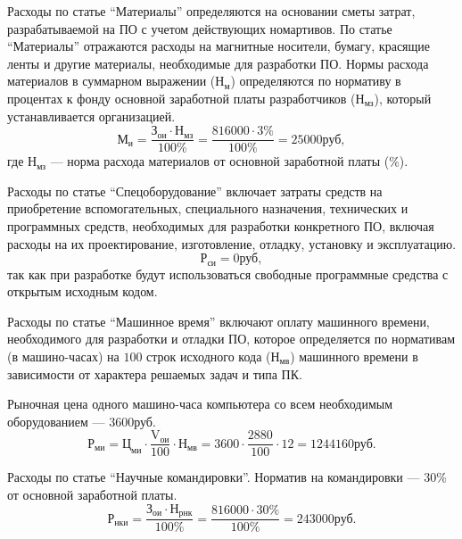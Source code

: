 Расходы по статье ``Материалы'' определяются на основании сметы затрат, разрабатываемой на ПО с учетом действующих номартивов. По статье ``Материалы'' отражаются расходы на магнитные носители, бумагу, красящие ленты и другие материалы, необходимые для разработки ПО. Нормы расхода материалов в суммарном выражении (\( \text{Н}_{\text{м}} \)) определяются по нормативу в процентах к фонду основной заработной платы разработчиков (\( \text{Н}_{\text{мз}} \)), который устанавливается организацией.
\begin{displaymath}
  \text{М}_{\text{и}} = \frac{\text{З}_{\text{ои}} \cdot \text{Н}_{\text{мз}}}{100\%} = \frac{816000 \cdot 3\%}{100\%} = 25000 \text{руб},
\end{displaymath}
где \( \text{Н}_{\text{мз}} \) --- норма расхода материалов от основной заработной платы (\( \% \)).

Расходы по статье ``Спецоборудование'' включает затраты средств на приобретение вспомогательных, специального назначения, технических и программных средств, необходимых для разработки конкретного ПО, включая расходы на их проектирование, изготовление, отладку, установку и эксплуатацию.
\begin{displaymath}
  \text{Р}_{\text{си}} = 0 \text{руб},
\end{displaymath}
так как при разработке будут использоваться свободные программные средства с открытым исходным кодом.

Расходы по статье ``Машинное время'' включают оплату машинного времени, необходимого для разработки и отладки ПО, которое определяется по нормативам (в машино-часах) на \( 100 \) строк исходного кода (\( \text{Н}_{\text{мв}} \)) машинного времени в зависимости от характера решаемых задач и типа ПК.

Рыночная цена одного машино-часа компьютера со всем необходимым оборудованием --- \( 3600 \text{руб} \).
\begin{displaymath}
  \text{Р}_{\text{ми}} = \text{Ц}_{\text{ми}} \cdot \frac{\text{V}_{\text{ои}}}{100} \cdot \text{Н}_{\text{мв}} = 3600 \cdot \frac{2880}{100} \cdot 12 = 1244160 \text{руб}.
\end{displaymath}

Расходы по статье ``Научные командировки''. Норматив на командировки --- \( 30\% \) от основной заработной платы.
\begin{displaymath}
  \text{Р}_{\text{нки}} = \frac{\text{З}_{\text{ои}} \cdot \text{Н}_{\text{рнк}}}{100\%} = \frac{816000 \cdot 30\%}{100\%} = 243000 \text{руб}.
\end{displaymath}

